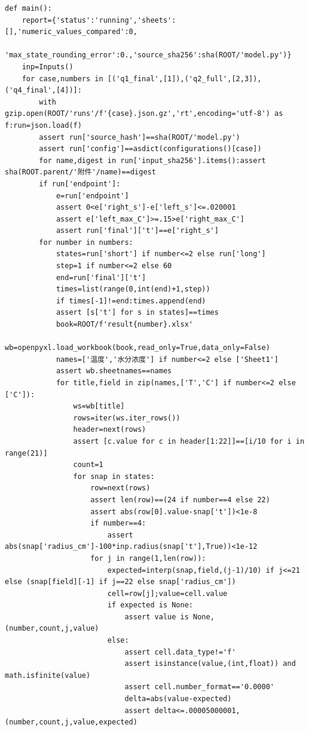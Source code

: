 \begin{verbatim}
def main():
    report={'status':'running','sheets':[],'numeric_values_compared':0,
            'max_state_rounding_error':0.,'source_sha256':sha(ROOT/'model.py')}
    inp=Inputs()
    for case,numbers in [('q1_final',[1]),('q2_full',[2,3]),('q4_final',[4])]:
        with gzip.open(ROOT/'runs'/f'{case}.json.gz','rt',encoding='utf-8') as f:run=json.load(f)
        assert run['source_hash']==sha(ROOT/'model.py')
        assert run['config']==asdict(configurations()[case])
        for name,digest in run['input_sha256'].items():assert sha(ROOT.parent/'附件'/name)==digest
        if run['endpoint']:
            e=run['endpoint']
            assert 0<e['right_s']-e['left_s']<=.020001
            assert e['left_max_C']>=.15>e['right_max_C']
            assert run['final']['t']==e['right_s']
        for number in numbers:
            states=run['short'] if number<=2 else run['long']
            step=1 if number<=2 else 60
            end=run['final']['t']
            times=list(range(0,int(end)+1,step))
            if times[-1]!=end:times.append(end)
            assert [s['t'] for s in states]==times
            book=ROOT/f'result{number}.xlsx'
            wb=openpyxl.load_workbook(book,read_only=True,data_only=False)
            names=['温度','水分浓度'] if number<=2 else ['Sheet1']
            assert wb.sheetnames==names
            for title,field in zip(names,['T','C'] if number<=2 else ['C']):
                ws=wb[title]
                rows=iter(ws.iter_rows())
                header=next(rows)
                assert [c.value for c in header[1:22]]==[i/10 for i in range(21)]
                count=1
                for snap in states:
                    row=next(rows)
                    assert len(row)==(24 if number==4 else 22)
                    assert abs(row[0].value-snap['t'])<1e-8
                    if number==4:
                        assert abs(snap['radius_cm']-100*inp.radius(snap['t'],True))<1e-12
                    for j in range(1,len(row)):
                        expected=interp(snap,field,(j-1)/10) if j<=21 else (snap[field][-1] if j==22 else snap['radius_cm'])
                        cell=row[j];value=cell.value
                        if expected is None:
                            assert value is None,(number,count,j,value)
                        else:
                            assert cell.data_type!='f'
                            assert isinstance(value,(int,float)) and math.isfinite(value)
                            assert cell.number_format=='0.0000'
                            delta=abs(value-expected)
                            assert delta<=.00005000001,(number,count,j,value,expected)

\end{verbatim}
